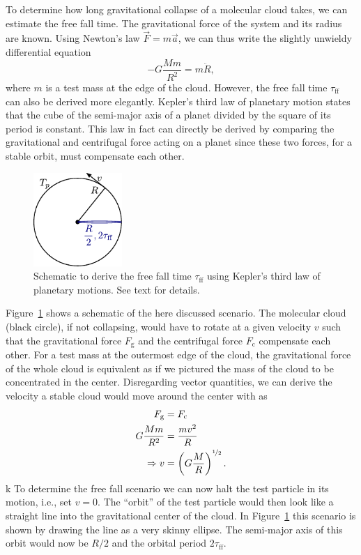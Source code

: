 To determine how long gravitational collapse of a molecular cloud takes, we can estimate the free fall time. The gravitational force of the system and its radius are known. Using Newton's law $\vec{F} = m\vec{a}$, we can thus write the slightly unwieldy differential equation
\begin{equation}
    -G\frac{Mm}{R^2} = m\ddot{R},
\end{equation}
where $m$ is a test mass at the edge of the cloud. However, the free fall time $\tau_\mathrm{ff}$ can also be derived more elegantly. Kepler's third law of planetary motion states that the cube of the semi-major axis of a planet divided by the square of its period is constant. This law in fact can directly be derived by comparing the gravitational and centrifugal force acting on a planet since these two forces, for a stable orbit, must compensate each other.
\begin{figure}[tb]
    \centering
    \includegraphics[width=0.3\textwidth]{graphics/star_formation/kepler3}
    \caption{Schematic to derive the free fall time $\tau_\mathrm{ff}$ using Kepler's third law of planetary motions. See text for details.}
    \label{fig:star_formation:kepler3_free_fall_time_schematic}
\end{figure}
Figure~\ref{fig:star_formation:kepler3_free_fall_time_schematic} shows a schematic of the here discussed scenario. The molecular cloud (black circle), if not collapsing, would have to rotate at a given velocity $v$ such that the gravitational force $F_\mathrm{g}$ and the centrifugal force $F_\mathrm{c}$ compensate each other. For a test mass at the outermost edge of the cloud, the gravitational force of the whole cloud is equivalent as if we pictured the mass of the cloud to be concentrated in the center. Disregarding vector quantities, we can derive the velocity a stable cloud would move around the center with as
\begin{equation}
    \begin{aligned}
        F_\mathrm{g} &= F_\mathrm{c} \\ 
        G\frac{Mm}{R^2} &= \frac{mv^2}{R}\\
        \Rightarrow v &= \left(G\frac{M}{R}\right)^{\nicefrac{1}{2}}.
    \end{aligned}
    \label{eqn:star_formation:velocity_orbit_stable_molecular_cloud}
\end{equation}
k
To determine the free fall scenario we can now halt the test particle in its motion, i.e., set $v=0$. The ``orbit'' of the test particle would then look like a straight line into the gravitational center of the cloud. In Figure~\ref{fig:star_formation:kepler3_free_fall_time_schematic} this scenario is shown by drawing the line as a very skinny ellipse. The semi-major axis of this orbit would now be $R/2$ and the orbital period $2\tau_\mathrm{ff}$. 

